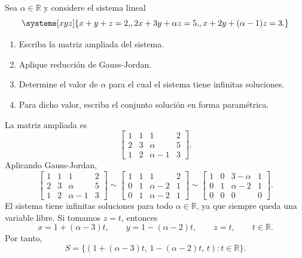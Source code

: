 \documentclass[11pt,respuestas,a4]{aleph-examen}
\begin{document}
\begin{preguntas}
\item
Sea \( \alpha \in \mathbb{R} \) y considere el sistema lineal
\[
\systeme[xyz]{
x+y+z=2{,},
2x+3y+\alpha z=5{,},
x+2y+{(\alpha-1)} z=3{.}
}
\]

\begin{enumerate}
    \item Escriba la matriz ampliada del sistema.
    \item Aplique reducción de Gauss-Jordan.
    \item Determine el valor de \( \alpha \) para el cual el sistema tiene infinitas soluciones.
    \item Para dicho valor, escriba el conjunto solución en forma paramétrica.
\end{enumerate}

\begin{respuesta}
La matriz ampliada es
\[
    \left[\begin{array}{ccc|c}
        1 & 1 & 1 & 2 \\
        2 & 3 & \alpha & 5 \\
        1 & 2 & \alpha-1 & 3
    \end{array}\right].
\]
Aplicando Gauss-Jordan,
\[
    \left[\begin{array}{ccc|c}
        1 & 1 & 1 & 2 \\
        2 & 3 & \alpha & 5 \\
        1 & 2 & \alpha-1 & 3
    \end{array}\right]
    \sim
    \left[\begin{array}{ccc|c}
        1 & 1 & 1 & 2 \\
        0 & 1 & \alpha-2 & 1 \\
        0 & 1 & \alpha-2 & 1
    \end{array}\right]
    \sim
    \left[\begin{array}{ccc|c}
        1 & 0 & 3-\alpha & 1 \\
        0 & 1 & \alpha-2 & 1 \\
        0 & 0 & 0 & 0
    \end{array}\right].
\]
El sistema tiene infinitas soluciones para todo \(\alpha\in\mathbb{R}\), ya que siempre queda una variable libre. Si tomamos \(z=t\), entonces
\[
    x=1+(\alpha-3)t,\qquad y=1-(\alpha-2)t,\qquad z=t,\qquad t\in\mathbb{R}.
\]
Por tanto,
\[
    S=\{(1+(\alpha-3)t,\,1-(\alpha-2)t,\,t): t\in\mathbb{R}\}.
\]
\end{respuesta}


\end{preguntas}
\end{document}
